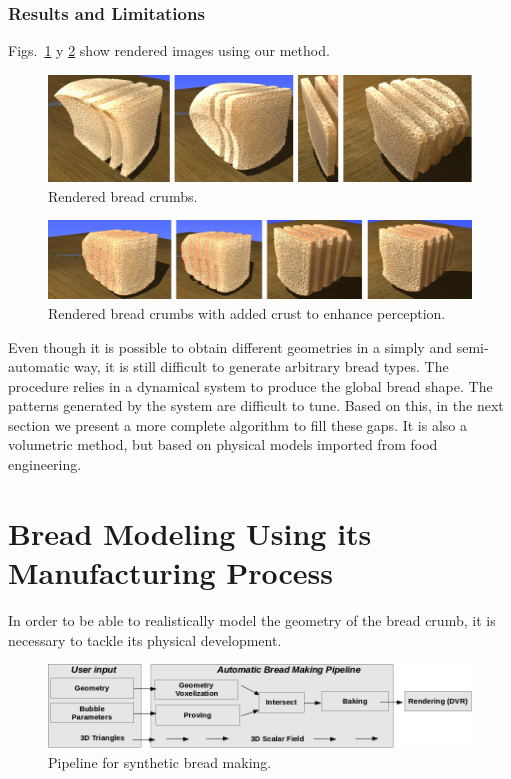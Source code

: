 \subsubsection{Results and Limitations}
Figs.~\ref{fg:crumb} y \ref{fg:results2} show rendered images using our method.

\begin{figure}
  \centerline{\includegraphics[width=13cm]{figures/crumb}}
  \caption{Rendered bread crumbs.}
  \label{fg:crumb}
\end{figure}

\begin{figure}
  \centerline{\includegraphics[width=13cm]{figures/results2}}
  \caption{Rendered bread crumbs with added crust to enhance perception.}
  \label{fg:results2}
\end{figure}


Even though it is possible to obtain different geometries in a simply and semi-automatic way, it is still difficult to generate arbitrary bread types.
The procedure relies in a dynamical system to produce the global bread shape.
The patterns generated by the system are difficult to tune.
Based on this, in the next section we present a more complete algorithm to fill these gaps.
It is also a volumetric method, but based on physical models imported from food engineering.


\section{Bread Modeling Using its Manufacturing Process}
In order to be able to realistically model the geometry of the bread crumb, it is necessary to tackle its physical development.


\begin{figure}
\includegraphics[width=13cm]{figures/pipeline}
\caption{Pipeline for synthetic bread making.}
\label{FigPipeline}
\end{figure}


